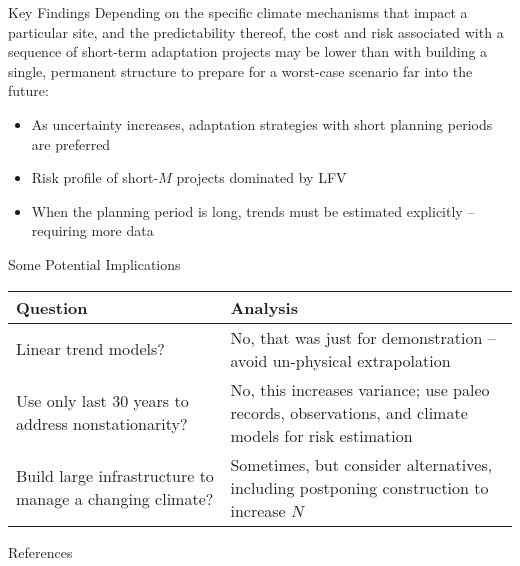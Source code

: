 \documentclass[
  10pt,     %
  handout   %
]{beamer}
\begin{document}
\begin{frame}{Key Findings}
  Depending on the specific climate mechanisms that impact a particular site, and the predictability thereof, the cost and risk associated with a sequence of short-term adaptation projects may be lower than with building a single, permanent structure to prepare for a worst-case scenario far into the future:
  \begin{itemize}
      \item As uncertainty increases, adaptation strategies with short planning periods are preferred
      \item Risk profile of short-$M$ projects dominated by LFV \citep{Jain:2001hz, Hodgkins:2017hw}
      \item When the planning period is long, trends must be estimated explicitly -- requiring more data
  \end{itemize}
\end{frame}

\begin{frame}{Some Potential Implications}
  \begin{table}
    \begin{tabular}{L{0.425\textwidth}L{0.525\textwidth}}
      \toprule
      Question & Analysis \\\midrule
      Linear trend models? & No, that was just for demonstration -- avoid un-physical extrapolation \\\midrule
      Use only last 30 years to address nonstationarity? & No, this increases variance; use paleo records, observations, and climate models for risk estimation \\\midrule
      Build large infrastructure to manage a changing climate? & Sometimes, but consider alternatives, including postponing construction to increase $N$\\
      \bottomrule
    \end{tabular}
  \end{table}
\end{frame}


\begin{frame}[allowframebreaks]{References}
  \renewcommand*{\bibfont}{\footnotesize}
  \renewcommand{\bibsection}{}
  \nocite{DossGollin:TjTkb07T}
	
  
\end{frame}
\end{document}
